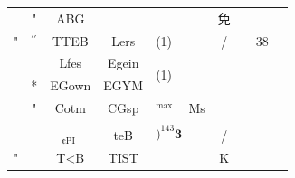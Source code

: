 \documentclass[10pt]{article}
\begin{document}
\begin{center}
\begin{tabular}{|c|c|c|c|c|c|c|c|c|c|c|}
{{}} &  &  &  &  \\
\hline
 & " & ABG &  &  &  &  & 免 &  &  &  \\
\hline
" & \({ }^{\prime \prime}\) & TTEB & Lers & \multicolumn{3}{|l|}{(1)} & / &  & 38 &  \\
\hline
 &  & Lfes & Egein & \multicolumn{3}{|l|}{\multirow[t]{2}{*}{(1)}} &  &  &  &  \\
\hline
 & * & EGown & EGYM &  &  &  &  &  &  &  \\
\hline
 & " & Cotm & CGsp & \({ }^{\text {max }}\) & \multicolumn{2}{|l|}{Ms} &  &  &  &  \\
\hline
 &  &  &  & \multicolumn{3}{|l|}{\multirow[t]{2}{*}{\()^{143} \mathbf{3}\)}} &  &  &  &  \\
\hline
 &  & \({ }_{\text {¢PI }}\) & teB &  &  &  & / &  &  &  \\
\hline
" &  & T<B & TIST & \multicolumn{3}{|l|}{} & K &  &  &  \\
\hline

\end{tabular}
\end{center}
\end{document}
